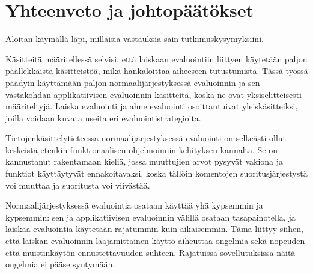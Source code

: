 
\section{Yhteenveto ja johtopäätökset}\label{yhteenveto}

Aloitan käymällä läpi, millaisia vastauksia sain tutkimuskysymyksiini.

Käsitteitä määritellessä selvisi, että laiskaan evaluointiin liittyen käytetään paljon päällekkäistä käsitteistöä, mikä hankaloittaa aiheeseen tutustumista. Tässä työssä päädyin käyttämään paljon normaalijärjestyksessä evaluoinnin ja sen vastakohdan applikatiivisen evaluoinnin käsitteitä, koska ne ovat yksiselitteisesti määriteltyjä. Laiska evaluointi ja ahne evaluointi osoittautuivat yleiskäsitteiksi, joilla voidaan kuvata useita eri evaluointistrategioita.

Tietojenkäsittelytieteessä normaalijärjestyksessä evaluointi on selkeästi ollut keskeistä etenkin funktionaalisen ohjelmoinnin kehityksen kannalta. Se on kannustanut rakentamaan kieliä, jossa muuttujien arvot pysyvät vakiona ja funktiot käyttäytyvät ennakoitavaksi, koska tällöin komentojen suoritusjärjestystä voi muuttaa ja suoritusta voi viivästää.

Normaalijärjestyksessä evaluointia osataan käyttää yhä kypsemmin ja kypsemmin: sen ja applikatiivisen evaluoinnin välillä osataan tasapainotella, ja laiskaa evaluointia käytetään rajatummin kuin aikaisemmin. Tämä liittyy siihen, että laiskan evaluoinnin laajamittainen käyttö aiheuttaa ongelmia sekä nopeuden että muistinkäytön ennustettavuuden suhteen. Rajatuissa sovellutuksissa näitä ongelmia ei pääse syntymään.

